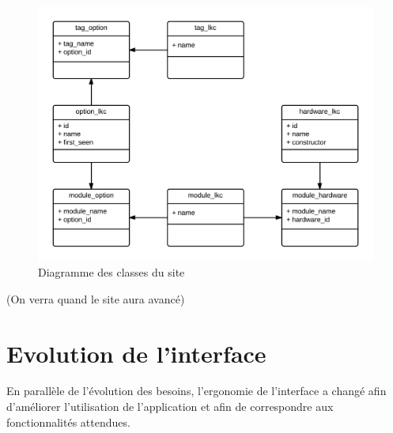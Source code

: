 \documentclass[16pts]{report}
\begin{document}
\begin{figure}[H]
	\includegraphics[scale=0.2]{../illustrations/diagramme_classes_site.png}
	\centering
	\caption{Diagramme des classes du site}
	\label{fig:DiagSite}
\end{figure}

(On verra quand le site aura avancé)

\pagebreak

\section{Evolution de l'interface}
\label{sec:Evolution de l'interface}

En parallèle de l'évolution des besoins, l'ergonomie de l'interface a changé 
afin d'améliorer l'utilisation de l'application et afin de correspondre aux 
fonctionnalités attendues.
\end{document}
